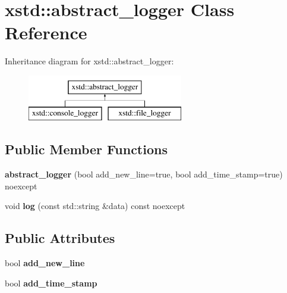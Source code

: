 \hypertarget{classxstd_1_1abstract__logger}{\section{xstd\-:\-:abstract\-\_\-logger Class Reference}
\label{classxstd_1_1abstract__logger}
}
Inheritance diagram for xstd\-:\-:abstract\-\_\-logger\-:\begin{figure}[H]
\begin{center}
\leavevmode
\includegraphics[height=2.000000cm]{classxstd_1_1abstract__logger}
\end{center}
\end{figure}
\subsection*{Public Member Functions}
\begin{DoxyCompactItemize}
\item 
\hypertarget{classxstd_1_1abstract__logger_a57d17bcf4d3260fab819d98643671c78}{{\bfseries abstract\-\_\-logger} (bool add\-\_\-new\-\_\-line=true, bool add\-\_\-time\-\_\-stamp=true) noexcept}\label{classxstd_1_1abstract__logger_a57d17bcf4d3260fab819d98643671c78}

\item 
\hypertarget{classxstd_1_1abstract__logger_ad470970ac4726355f3423017f434ace8}{void {\bfseries log} (const std\-::string \&data) const noexcept}\label{classxstd_1_1abstract__logger_ad470970ac4726355f3423017f434ace8}

\end{DoxyCompactItemize}
\subsection*{Public Attributes}
\begin{DoxyCompactItemize}
\item 
\hypertarget{classxstd_1_1abstract__logger_a5216ec0a18fea2571db19d5a55d8700f}{bool {\bfseries add\-\_\-new\-\_\-line}}\label{classxstd_1_1abstract__logger_a5216ec0a18fea2571db19d5a55d8700f}

\item 
\hypertarget{classxstd_1_1abstract__logger_a534b4f6a3dcdd3b7f18abfcb1bb5b937}{bool {\bfseries add\-\_\-time\-\_\-stamp}}\label{classxstd_1_1abstract__logger_a534b4f6a3dcdd3b7f18abfcb1bb5b937}

\end{DoxyCompactItemize}

